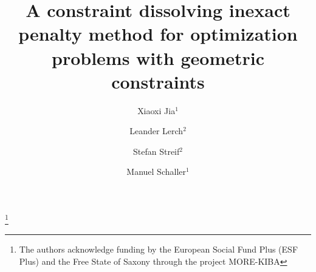 \documentclass[11pt,a4paper,reqno]{amsart}
\begin{document}
\title[A constraint dissolving method for problems with geometric constraints]{A constraint dissolving inexact penalty method for optimization problems with geometric constraints}




\author{Xiaoxi Jia$^1$}\address{$^1$Faculty of Mathematics, Chemnitz University of Technology, Germany\\ Mail: \textsc{\{xiaoxi.jia,manuel.schaller\}@math.tu-chemnitz.de}}
\author{Leander Lerch$^2$}\address{$^2$Faculty of Electrical Engineering and Information Technology, Chemnitz University of Technology, Germany\\ Mail: Mail: \textsc{\{leander.lerch,stefan.streif\}@etit.tu-chemnitz.de}}
\author{Stefan Streif$^2$}
\author{Manuel Schaller$^1$}


\thanks{The authors acknowledge funding by the European Social Fund Plus (ESF Plus) and the Free State of Saxony through the project MORE-KIBA}
\end{document}
